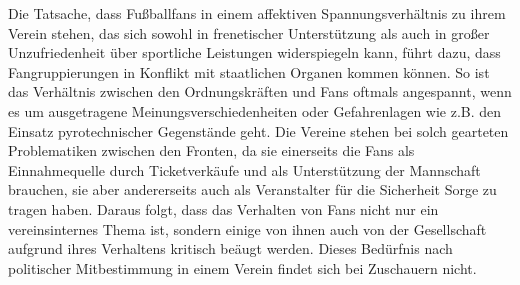 Die Tatsache, dass Fußballfans in einem affektiven Spannungsverhältnis zu ihrem Verein stehen, das sich sowohl in frenetischer Unterstützung als auch in großer Unzufriedenheit über sportliche Leistungen widerspiegeln kann, führt dazu, dass Fangruppierungen in Konflikt mit staatlichen Organen kommen können.
So ist das Verhältnis zwischen den Ordnungskräften und Fans oftmals angespannt, wenn es um ausgetragene Meinungsverschiedenheiten oder Gefahrenlagen wie z.B. den Einsatz pyrotechnischer Gegenstände geht.
Die Vereine stehen bei solch gearteten Problematiken zwischen den Fronten, da sie einerseits die Fans als Einnahmequelle durch Ticketverkäufe und als Unterstützung der Mannschaft brauchen, sie aber andererseits auch als Veranstalter für die Sicherheit Sorge zu tragen haben.
Daraus folgt, dass das Verhalten von Fans nicht nur ein vereinsinternes Thema ist, sondern einige von ihnen auch von der Gesellschaft aufgrund ihres Verhaltens kritisch beäugt werden.
Dieses Bedürfnis nach politischer Mitbestimmung in einem Verein findet sich bei Zuschauern nicht.
